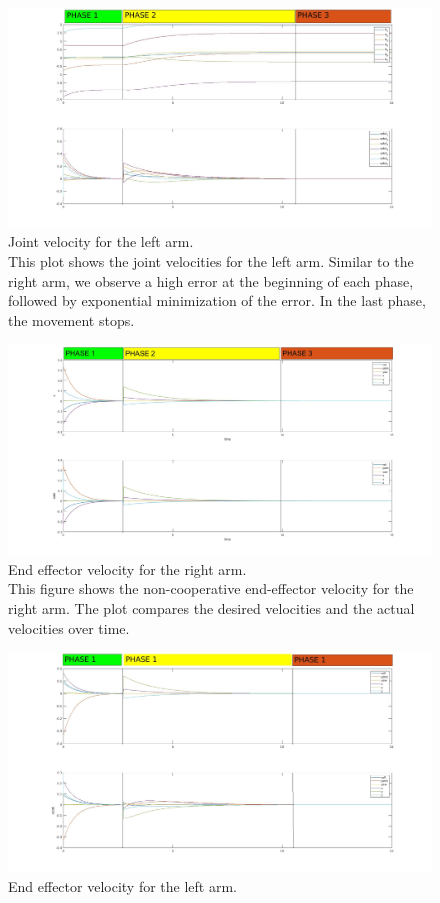\documentclass{article}
\begin{document}
\begin{figure}[h]
    \centering
    \includegraphics[width=1\textwidth]{imgs/ex3/joint velocity left.jpg}
    \caption{Joint velocity for the left arm.\\
	This plot shows the joint velocities for the left arm. Similar to the right arm, we observe a high error at the beginning of each phase, followed by exponential minimization of the error. In the last phase, the movement stops.
}
\end{figure}

\begin{figure}[h]
    \centering
    \includegraphics[width=1\textwidth]{imgs/ex3/non coop velocity right.jpg}
    \caption{End effector velocity for the right arm.\\
	This figure shows the non-cooperative end-effector velocity for the right arm. The plot compares the desired velocities and the actual velocities over time.
}
\end{figure}

\begin{figure}[h]
    \centering
    \includegraphics[width=1\textwidth]{imgs/ex3/non coop velocity left.jpg}
    \caption{End effector velocity for the left arm.
}
\end{figure}
\end{document}
